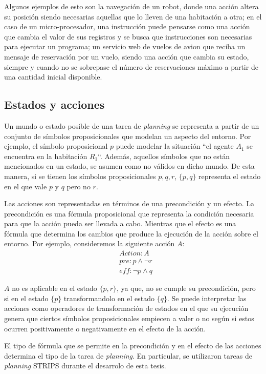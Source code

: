 Algunos ejemplos de esto son la navegación de un robot, donde una acción altera
su posición siendo necesarias aquellas que lo lleven de una habitación a otra;
en el caso de un micro-procesador, una instrucción puede pensarse como una
acción que cambia el valor de sus registros y se busca que instrucciones son
necesarias para ejecutar un programa; un servicio web de vuelos de avion que
reciba un mensaje de reservación por un vuelo, siendo una acción que cambia su
estado, siempre y cuando no se sobrepase el número de reservaciones máximo a
partir de una cantidad inicial disponible. \citep{Sandewall-2008-HandbookOK}

\subsection{Estados y acciones}

Un mundo o estado  posible de una tarea de \emph{planning} se representa a
partir de un conjunto de símbolos proposicionales que modelan un aspecto del
entorno. Por ejemplo, el símbolo proposicional $p$ puede modelar la situación
``el agente $A_1$ se encuentra en la habitación $R_1$``. Además, aquellos
símbolos  que no están mencionados en un estado, se asumen como no válidos en
dicho mundo. De esta manera, si se tienen los símbolos proposicionales $p,q,r$,
$\{p, q\}$ representa el estado en el que vale $p$ y $q$ pero no $r$. 

Las acciones son representadas en términos de una precondición y un efecto. La
precondición es una fórmula proposicional que representa la condición necesaria
para que la acción pueda ser llevada a cabo. Mientras que el efecto es una
fórmula que determina los cambios que produce la ejecución de la acción sobre el
entorno. Por ejemplo, consideremos la siguiente acción $A$:
\begin{align*}
    & Action : A \\
    & pre : p \land \neg r \\
    & eff : \neg p \land q
\end{align*}

$A$ no es aplicable en el estado $\{p, r\}$, ya que, no se cumple su
precondición, pero si en el estado $\{p\}$ transformandolo en el estado $\{q\}$. Se puede interpretar las acciones como operadores de transformación de
estados en el que su ejecución genera que ciertos símbolos proposicionales
empiecen a valer o no según si estos ocurren positivamente o negativamente en el
efecto de la acción.

El tipo de fórmula que se permite en la precondición y en el efecto de las
acciones determina el tipo de la tarea de \emph{planning}. En particular, se
utilizaron tareas de \emph{planning} STRIPS durante el desarrolo de esta tesis.

